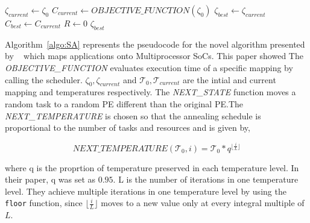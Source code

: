 \begin{algorithm}[h!]
  \small{
    \caption{$Simulated\_Annealing(\zeta_0, \mathcal{T}_0)$}
    \label{algo:SA}
    $\zeta_{current} \leftarrow \zeta_0$ \;
    $C_{current} \leftarrow OBJECTIVE\_FUNCTION(\zeta_0)$ \;
    $\zeta_{best} \leftarrow \zeta_{current}$\;
    $C_{best} \leftarrow C_{current}$\;
    $R \leftarrow 0$\;
    \Return $\zeta_{best}$
  }
\end{algorithm}

Algorithm~\ref{algo:SA} represents the pseudocode for the novel algorithm
presented by ~\cite{hors06} which maps applications onto Multiprocessor SoCs.
This paper showed  The \textit{OBJECTIVE\_FUNCTION} evaluates execution time of a
specific mapping by calling the scheduler. $\zeta_0, \zeta_{current}$ and
$\mathcal{T}_0, \mathcal{T}_{current}$ are the intial and current mapping and
temperatures respectively. The \textit{NEXT\_STATE} function moves a random task
to a random PE different than the original PE.The \textit{NEXT\_TEMPERATURE} is
chosen so that the annealing schedule is proportional to the number of tasks and
resources and is given by,

\begin{equation}
\textit{NEXT\_TEMPERATURE}(\mathcal{T}_0, i) = \mathcal{T}_0*q^{\lfloor
\frac{i}{L} \rfloor}
\end{equation}

where q is the proprtion of temperature preserved in each temperature level. In
their paper, q was set as $0.95$. L is the number of iterations in one
temperature level. They achieve multiple iterations in one temperature level by
using the \texttt{floor} function, since $\lfloor \frac{i}{L} \rfloor$ moves to
a new value only at every integral multiple of $L$.

